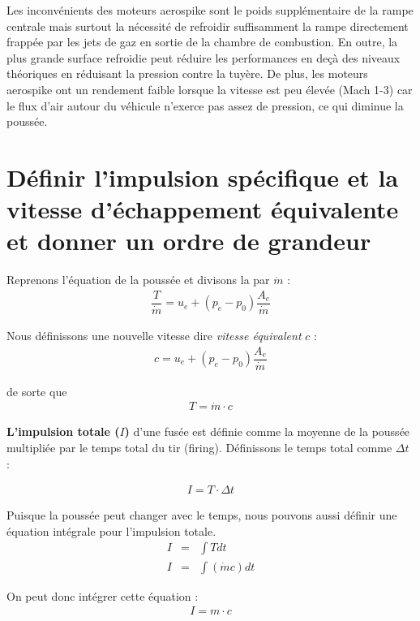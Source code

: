\documentclass{report}
\begin{document}
Les inconvénients des moteurs aerospike sont le poids supplémentaire de la rampe centrale mais surtout la nécessité de refroidir suffisamment la rampe directement frappée par les jets de gaz en sortie de la chambre de combustion. En outre, la plus grande surface refroidie peut réduire les performances en deçà des niveaux théoriques en réduisant la pression contre la tuyère. De plus, les moteurs aerospike ont un rendement faible lorsque la vitesse est peu élevée (Mach 1-3) car le flux d'air autour du véhicule n'exerce pas assez de pression, ce qui diminue la poussée.




\section{Définir l'impulsion spécifique et la vitesse d'échappement équivalente et donner un ordre de grandeur}

Reprenons l'équation de la poussée et divisons la par $\dot{m}$ :
\begin{eqnarray}
\dfrac{T}{\dot{m}} = u_e+(p_e-p_0)\dfrac{A_e}{\dot{m}}
\end{eqnarray}

Nous définissons une nouvelle vitesse dire \textit{vitesse équivalent} $c$ :
\begin{eqnarray}
c = u_e+(p_e-p_0)\dfrac{A_e}{\dot{m}}
\end{eqnarray}

de sorte que
\begin{eqnarray}
T = \dot{m} \cdot c
\end{eqnarray}

\textbf{L'impulsion totale ($I$)} d'une fusée est définie comme la moyenne de la poussée multipliée par le temps total du tir (firing). Définissons le temps total comme $\Delta t$ :

\begin{eqnarray}
I=T\cdot\Delta t
\end{eqnarray}

Puisque la poussée peut changer avec le temps, nous pouvons aussi définir une équation intégrale pour l'impulsion totale. 
\begin{eqnarray}
I &= &\int T dt\\
I &= &\int(\dot{m} c)dt
\end{eqnarray}

On peut donc intégrer cette équation :
\begin{eqnarray}
I = m\cdot c
\end{eqnarray}
\end{document}

